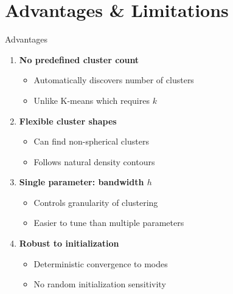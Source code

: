 \section{Advantages \& Limitations}

\begin{frame}{Advantages}
    \begin{enumerate}
        \item \textbf{No predefined cluster count}
        \begin{itemize}
            \item Automatically discovers number of clusters
            \item Unlike K-means which requires $k$
        \end{itemize}

        \vspace{0.3cm}

        \item \textbf{Flexible cluster shapes}
        \begin{itemize}
            \item Can find non-spherical clusters
            \item Follows natural density contours
        \end{itemize}

        \vspace{0.3cm}

        \item \textbf{Single parameter: bandwidth $h$}
        \begin{itemize}
            \item Controls granularity of clustering
            \item Easier to tune than multiple parameters
        \end{itemize}

        \vspace{0.3cm}

        \item \textbf{Robust to initialization}
        \begin{itemize}
            \item Deterministic convergence to modes
            \item No random initialization sensitivity
        \end{itemize}
    \end{enumerate}
\end{frame}

